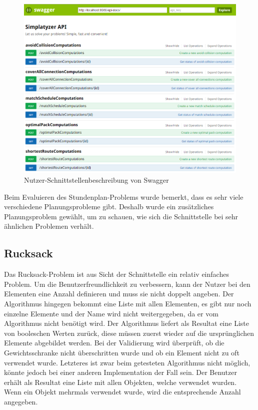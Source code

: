 \begin{figure}[h]
\centering
\includegraphics[scale=0.5]{images/swagger_api.png}
\caption[Nutzer-Schnittstellenbeschreibung von Swagger]{Nutzer-Schnittstellenbeschreibung von Swagger \selfmade{}}
\label{fig:swagger}
\end{figure}

\FloatBarrier

Beim Evaluieren des Stundenplan-Problems wurde bemerkt, dass es sehr viele verschiedene Planungsprobleme gibt. Deshalb wurde ein zusätzliches Planungsproblem gewählt, 
um zu schauen, wie sich die Schnittstelle bei sehr ähnlichen Problemen verhält.

%
%
%
%

\subsection{Rucksack}
Das Rucksack-Problem ist aus Sicht der Schnittstelle ein relativ einfaches Problem. Um die Benutzerfreundlichkeit zu verbessern, kann der Nutzer bei den Elementen eine Anzahl definieren und 
muss sie nicht doppelt angeben. Der Algorithmus hingegen bekommt eine Liste mit allen Elementen, es gibt nur noch einzelne Elemente und der Name wird nicht weitergegeben, da er vom 
Algorithmus nicht benötigt wird. Der Algorithmus liefert als Resultat eine Liste von booleschen Werten zurück, diese müssen zuerst wieder auf die ursprünglichen Elemente abgebildet werden. Bei 
der Validierung wird überprüft, ob die Gewichtsschranke nicht überschritten wurde und ob ein Element nicht zu oft verwendet wurde. Letzteres ist zwar beim getesteten Algorithmus nicht 
möglich, könnte jedoch bei einer anderen Implementation der Fall sein. Der Benutzer erhält als Resultat eine Liste mit allen Objekten, welche verwendet wurden. Wenn ein Objekt mehrmals 
verwendet wurde, wird die entsprechende Anzahl angegeben.

